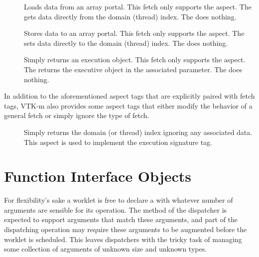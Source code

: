 \begin{description}
\item[] 
  Loads data from an array portal. This fetch only supports the
   aspect. The  gets data
  directly from the domain (thread) index. The  does
  nothing.
\item[] 
  Stores data to an array portal. This fetch only supports the
   aspect. The  sets data
  directly to the domain (thread) index. The  does nothing.
\item[] 
  Simply returns an execution object. This fetch only supports the
   aspect. The  returns the
  executive object in the associated parameter. The  does
  nothing.
\end{description}

In addition to the aforementioned aspect tags that are explicitly paired
with fetch tags, VTK-m also provides some aspect tags that either modify
the behavior of a general fetch or simply ignore the type of fetch.

\begin{description}
\item[]  Simply
  returns the domain (or thread) index ignoring any associated data. This
  aspect is used to implement the  execution signature
  tag.
\end{description}



\section{Function Interface Objects}
\label{sec:FunctionInterfaceObjects}


For flexibility's sake a worklet is free to declare a \controlsignature
with whatever number of arguments are sensible for its operation. The
 method of the dispatcher is expected to support arguments
that match these arguments, and part of the dispatching operation may
require these arguments to be augmented before the worklet is
scheduled. This leaves dispatchers with the tricky task of managing some
collection of arguments of unknown size and unknown types.

